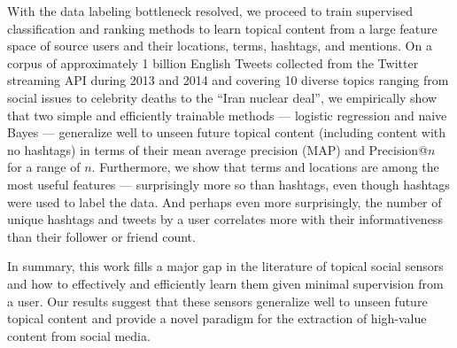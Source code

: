With the data labeling bottleneck resolved, we proceed to train
supervised classification and ranking methods to learn topical content
from a large feature space of source users and their locations, terms,
hashtags, and mentions.  On a corpus of approximately 1 billion
English Tweets
collected from the Twitter streaming API during 2013 and 2014 and
covering 10 diverse topics ranging from social issues to celebrity
deaths to the ``Iran nuclear deal'', we empirically show that two
simple and efficiently trainable methods --- logistic regression and
naive Bayes --- generalize well to unseen future topical content
(including content with no hashtags) in terms of their mean average
precision (MAP) and Precision@$n$ for a range of $n$.  Furthermore, we
show that terms and locations are among the most useful features ---
surprisingly more so than hashtags, even though hashtags were used to
label the data.  And perhaps even more surprisingly, the number of
unique hashtags and tweets by a user correlates more with their
informativeness than their follower or friend count.

In summary, this work fills a major gap in the literature of topical
social sensors and how to effectively and efficiently learn them given
minimal supervision from a user.  Our results suggest that these
sensors generalize well to unseen future topical content and provide a
novel paradigm for the extraction of high-value content from social
media.


